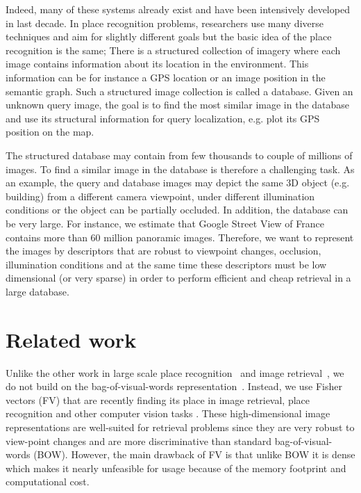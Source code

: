 \documentclass[table]{article} %
\begin{document}
	Indeed, many of these systems already exist \cite{Majdik2013, Torii2011} and have been intensively developed in last decade. In place recognition problems, researchers use many diverse techniques and aim for slightly different goals but the basic idea of the place recognition is the same; There is a structured collection of imagery where each image contains information about its location in the environment. This information can be for instance a GPS location or an image position in the semantic graph. Such a structured image collection is called a database. Given an unknown query image, the goal is to find the most similar image in the database and use its structural information for query localization, e.g. plot its GPS position on the map.

	The structured database may contain from few thousands to couple of millions of images.  To find a similar image in the database is therefore a challenging task. As an example, the query and database images may depict the same 3D object (e.g. building) from a different camera viewpoint, under different illumination conditions or the object can be partially occluded. In addition, the database can be very large. For instance, we estimate that Google Street View of France contains more than 60 million panoramic images. Therefore, we want to represent the images by descriptors that are robust to viewpoint changes, occlusion, illumination conditions and at the same time these descriptors must be low dimensional (or very sparse) in order to perform efficient and cheap retrieval in a large database.


\section{Related work} 
\label{sec:overview}
	Unlike the other work in large scale place recognition~\cite{Gronat2013,Cummins09,Knopp2010,Schindler07} and image retrieval~\cite{Nister06,Philbin07,Sivic2003}, we do not build on the bag-of-visual-words representation~\cite{Csurka04,Sivic2003}. Instead, we use Fisher vectors (FV) \cite{Jegou2011} that are recently finding its place in image retrieval, place recognition \cite{Torii2013} and other computer vision tasks \cite{Simonyan2013, Krapac2011}. These high-dimensional image representations are well-suited for retrieval problems since they are very robust to view-point changes and are more discriminative than standard bag-of-visual-words (BOW). However, the main drawback of FV is that unlike BOW it is dense which makes it nearly unfeasible for usage because of the memory footprint and computational cost.
\end{document}
